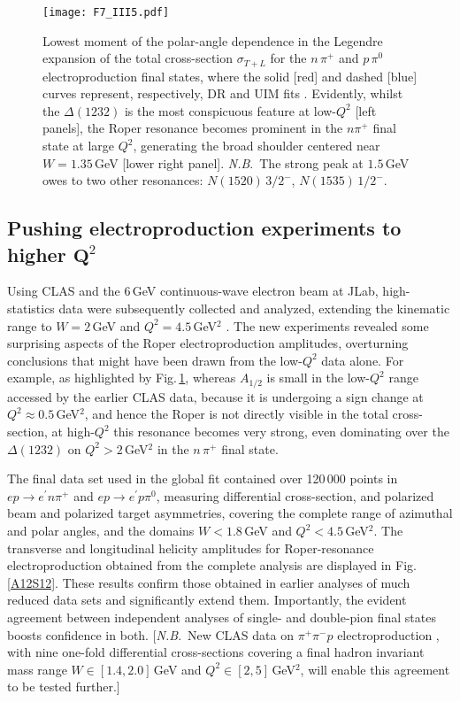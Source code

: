 \begin{figure}[t]
\centerline{\texttt{[image: F7\_III5.pdf]}}
\caption{\label{D0_moment}
Lowest moment of the polar-angle dependence in the Legendre expansion of the total cross-section $\sigma_{T+L}$ for the $n\,\pi^+$ and $p\,\pi^0$ electroproduction final states, where the solid [red] and dashed [blue] curves represent, respectively, DR and UIM fits \cite{Aznauryan:2009mx}.  Evidently, whilst the $\Delta(1232)$ is the most conspicuous feature at low-$Q^2$ [left panels], the Roper resonance becomes prominent in the $n \pi^+$ final state at large $Q^2$, generating the broad shoulder centered near $W=1.35\,$GeV [lower right panel].  \emph{N.B}.\ The strong peak at $1.5\,$GeV owes to two other resonances: $N(1520)\,3/2^-$, $N(1535)\,1/2^-$.
}
\end{figure}

\subsection{Pushing electroproduction experiments to higher $\mathbf Q^2$}
%
Using CLAS and the 6\,GeV continuous-wave electron beam at JLab, high-statistics data were subsequently collected and analyzed, extending the kinematic range to $W=2\,$GeV and $Q^2=4.5\,$GeV$^2$ \cite{Aznauryan:2008pe, Aznauryan:2009mx, Aznauryan:2011qj, Mokeev:2012vsa, Mokeev:2015lda}.
%
The new experiments revealed some surprising aspects of the Roper electroproduction amplitudes, overturning conclusions that might have been drawn from the low-$Q^2$ data alone.  For example, as highlighted by Fig.\,\ref{D0_moment}, whereas $A_{1/2}$ is small in the low-$Q^2$ range accessed by the earlier CLAS data, because it is undergoing a sign change at $Q^2\approx 0.5\,$GeV$^2$, and hence the Roper is not directly visible in the total cross-section, at high-$Q^2$ this resonance becomes very strong, even dominating over the $\Delta(1232)$ on $Q^2> 2\,$GeV$^2$ in the $n\,\pi^+$ final state.

The final data set used in the global fit contained over 120\,000 points in $e p \to e^\prime n \pi^+$ and $e p \to e^\prime p \pi^0$, measuring differential cross-section, and polarized beam and polarized target asymmetries, covering the complete range of azimuthal and polar angles, and the domains $W<1.8\,$GeV and $Q^2< 4.5\,$GeV$^2$.  The transverse and longitudinal helicity amplitudes for Roper-resonance electroproduction obtained from the complete analysis are displayed in Fig.\,\ref{A12S12}.  These results confirm those obtained in earlier analyses of much reduced data sets and significantly extend them.  Importantly, the evident agreement between independent analyses of single- and double-pion final states boosts confidence in both.  [\emph{N.B}.\ New CLAS data on $\pi^+ \pi^- p$ electroproduction \cite{Isupov:2017lnd}, with nine one-fold differential cross-sections covering a final hadron invariant mass range $W\in[1.4,2.0]\,$GeV and $Q^2\in [2,5]\,$GeV$^2$, will enable this agreement to be tested further.]

